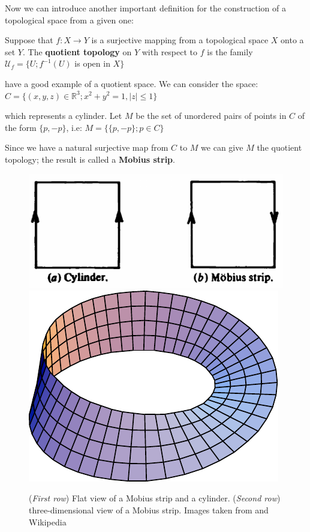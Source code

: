 Now we can introduce another important definition for the construction of a topological space from a given one:

\begin{definition}
 Suppose that $f \colon X \rightarrow Y$ is a surjective mapping from a topological space $X$ onto a set $Y$. The \textbf{quotient topology} on $Y$ with respect to $f$ is the family $\mathcal{U}_{f} = \{ U; f^{-1}(U)$ is open in $X \}$
\end{definition}

\cite{Kosniowski} have a good example of a quotient space. We can consider the space:
\begin{math}
 C = \{ (x,y,z) \in \mathbb{R}^{3}; x^{2} + y^{2} = 1, |z| \leq 1 \}
\end{math}

which represents a cylinder. Let $M$ be the set of unordered pairs of points in $C$ of the form $\{p,-p\}$, i.e:
\begin{math}
 M = \{ \{p,-p\}; p \in C \}
\end{math}

Since we have a natural surjective map from $C$ to $M$ we can give $M$ the quotient topology; the result is called a \textbf{Mobius strip}.

\begin{figure}[htb] %
   \centering
   \includegraphics[width=0.65\linewidth]{images/mobiusStripCylinder.png}\\
   \includegraphics[width=0.35\linewidth]{images/MobiusStrip.pdf}
   \caption[Relationship between Mobius strip and a cylinder]{(\textit{First row}) Flat view of a Mobius strip and a cylinder. (\textit{Second row}) three-dimensional view of a Mobius strip. Images taken from \cite{Kosniowski} and Wikipedia}
   \label{fig:MobiusCylinder}
\end{figure}

